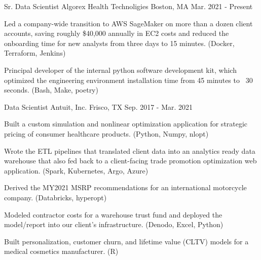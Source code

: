 

\begin{cventries}

  \cventry
    {Sr. Data Scientist} %
    {Algorex Health Technoligies} %
    {Boston, MA} %
    {Mar. 2021 - Present} %
    {
      \begin{cvitems} %
      \item {Led a company-wide transition to AWS SageMaker on more
          than a dozen client accounts, saving roughly \$40,000
          annually in EC2 costs and reduced the onboarding time for
          new analysts from three days to 15 minutes. (Docker, Terraform, Jenkins)}
      \item {Principal developer of the internal python software
          development kit, which optimized the engineering environment
          installation time from 45 minutes to ~30 seconds. (Bash, Make, poetry)}
      \end{cvitems}
    }

  \cventry
    {Data Scientist} %
    {Antuit, Inc.} %
    {Frisco, TX} %
    {Sep. 2017 - Mar. 2021} %
    {
      \begin{cvitems} %
      \item {Built a custom simulation and nonlinear optimization
          application for strategic pricing of consumer healthcare
          products. (Python, Numpy, nlopt)}
      \item {Wrote the ETL pipelines that translated client data into
          an analytics ready data warehouse that also fed back to a
          client-facing trade promotion optimization web
          application. (Spark, Kubernetes, Argo, Azure) }
      \item {Derived the MY2021 MSRP recommendations for an
          international motorcycle company. (Databricks, hyperopt)}
      \item {Modeled contractor costs for a warehouse trust fund and
          deployed the model/report into our client's
          infrastructure. (Denodo, Excel, Python)}
      \item {Built personalization, customer churn, and lifetime value
          (CLTV) models for a medical cosmetics manufacturer. (R)}
      \end{cvitems}
    }

\end{cventries}
